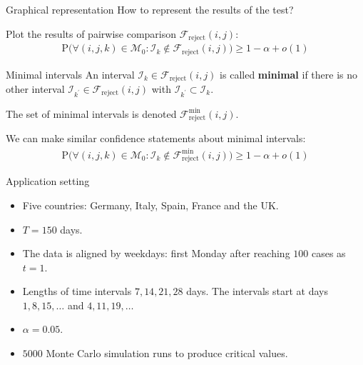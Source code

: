 \documentclass[10pt]{beamer}
\newcommand{\Prob}{\mathrm{P}}
\begin{document}
\begin{frame}{Graphical representation}
How to represent the results of the test? \pause

Plot the results of pairwise comparison $\mathcal{F}_{\text{reject}}(i, j)$:
\begin{align*}
 \Prob\Big( \forall (i,j,k) \in \mathcal{M}_0: \mathcal{I}_k \notin \mathcal{F}_{\text{reject}}(i, j) \Big) \ge 1 - \alpha + o(1)
\end{align*}

\pause
\begin{block}{Minimal intervals}
An interval $\mathcal{I}_k \in \mathcal{F}_{\text{reject}}(i, j)$ is called \textbf{minimal} if there is no other interval $\mathcal{I}_{k^\prime} \in \mathcal{F}_{\text{reject}}(i, j)$ with $\mathcal{I}_{k^\prime} \subset \mathcal{I}_k$.

The set of minimal intervals is denoted $\mathcal{F}_{\text{reject}}^{\min} (i, j)$.
\end{block}\pause
We can make similar confidence statements about minimal intervals:
\begin{align*}
 \Prob\Big( \forall (i,j,k) \in \mathcal{M}_0: \mathcal{I}_k \notin \mathcal{F}_{\text{reject}}^{\min} (i, j) \Big) \ge 1 - \alpha + o(1)
\end{align*}
\end{frame}

\begin{frame}{Application setting}
\begin{itemize}
\item Five countries: Germany, Italy, Spain, France and the UK.
\item $T = 150$ days. 
\item The data is aligned by weekdays: first Monday after reaching $100$ cases as $t=1$.
\item Lengths of time intervals $7, 14, 21, 28$ days. The intervals start at days $1, 8, 15, \ldots$ and $4, 11, 19, \ldots$
\item $\alpha = 0.05$.
\item $5000$ Monte Carlo simulation runs to produce critical values.
\end{itemize}
\end{frame}
\end{document}
